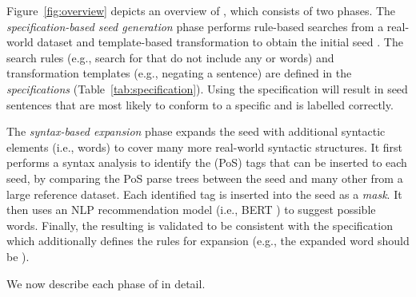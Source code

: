 Figure~\ref{fig:overview} depicts an overview of \tool{}, which
consists of two phases.  The \emph{specification-based seed
  generation} phase performs rule-based searches from a real-world
dataset and template-based transformation to obtain the
initial seed \sents.  The search rules (e.g., search for \neu
\sents that do not include any \pstv or \ngtv words) and
transformation templates (e.g., negating a sentence) are defined in the \emph{\lc
  specifications} (Table~\ref{tab:specification}). Using the specification will result in seed sentences that are most likely to conform
to a specific \lc and is labelled
correctly.

The \emph{syntax-based \sent expansion} phase expands the seed
\sents with additional syntactic elements (i.e., words) to cover many more real-world
syntactic structures. It first performs a syntax analysis
to identify the \pos (PoS) tags that can be inserted to each
seed, by comparing the PoS parse trees between the seed \sent and
many other \sents from a large reference dataset. Each identified
tag is inserted into the seed as a \emph{mask}. It then uses an NLP
recommendation model (i.e., BERT \cite{devlin2019bert}) to suggest possible
words.
Finally, the resulting \sent is validated to be consistent with the
specification which additionally defines the rules for expansion
(e.g., the expanded word should be \neu).

We now describe each phase of \tool{} in detail.


